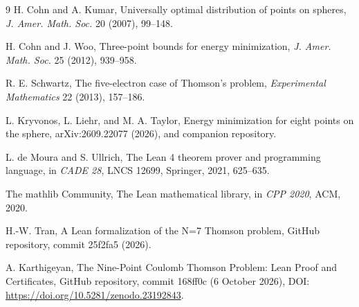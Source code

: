 \documentclass[11pt]{article}
\theoremstyle{definition}
\theoremstyle{remark}
\begin{document}
\begin{thebibliography}{9}
H. Cohn and A. Kumar, Universally optimal distribution of points on spheres, \emph{J. Amer. Math. Soc.} 20 (2007), 99--148.

H. Cohn and J. Woo, Three-point bounds for energy minimization, \emph{J. Amer. Math. Soc.} 25 (2012), 939--958.

R. E. Schwartz, The five-electron case of Thomson's problem, \emph{Experimental Mathematics} 22 (2013), 157--186.

L. Kryvonos, L. Liehr, and M. A. Taylor, Energy minimization for eight points on the sphere, arXiv:2609.22077 (2026), and companion repository.

L. de Moura and S. Ullrich, The Lean 4 theorem prover and programming language, in \emph{CADE 28}, LNCS 12699, Springer, 2021, 625--635.

The mathlib Community, The Lean mathematical library, in \emph{CPP 2020}, ACM, 2020.

H.-W. Tran, A Lean formalization of the N=7 Thomson problem, GitHub repository, commit 25f2fa5 (2026).

A. Karthigeyan, The Nine-Point Coulomb Thomson Problem: Lean Proof and Certificates, GitHub repository, commit 168ff0c (6 October 2026), DOI: \url{https://doi.org/10.5281/zenodo.23192843}.
\end{thebibliography}
\end{document}

